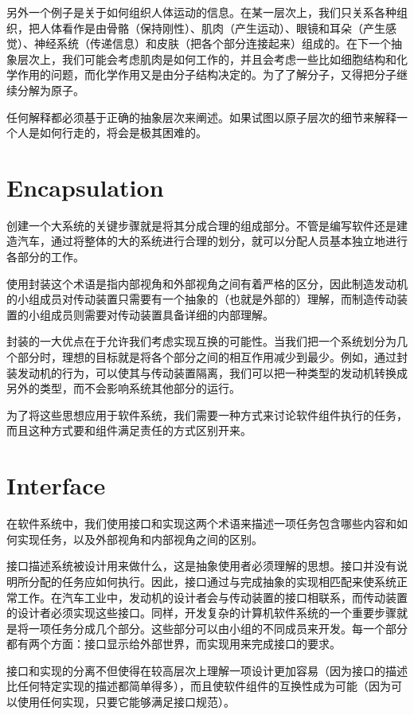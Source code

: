 另外一个例子是关于如何组织人体运动的信息。在某一层次上，我们只关系各种组织，把人体看作是由骨骼（保持刚性）、肌肉（产生运动）、眼镜和耳朵（产生感觉）、神经系统（传递信息）和皮肤（把各个部分连接起来）组成的。在下一个抽象层次上，我们可能会考虑肌肉是如何工作的，并且会考虑一些比如细胞结构和化学作用的问题，而化学作用又是由分子结构决定的。为了了解分子，又得把分子继续分解为原子。

任何解释都必须基于正确的抽象层次来阐述。如果试图以原子层次的细节来解释一个人是如何行走的，将会是极其困难的。


\section{Encapsulation}


创建一个大系统的关键步骤就是将其分成合理的组成部分。不管是编写软件还是建造汽车，通过将整体的大的系统进行合理的划分，就可以分配人员基本独立地进行各部分的工作。

使用封装这个术语是指内部视角和外部视角之间有着严格的区分，因此制造发动机的小组成员对传动装置只需要有一个抽象的（也就是外部的）理解，而制造传动装置的小组成员则需要对传动装置具备详细的内部理解。

封装的一大优点在于允许我们考虑实现互换的可能性。当我们把一个系统划分为几个部分时，理想的目标就是将各个部分之间的相互作用减少到最少。例如，通过封装发动机的行为，可以使其与传动装置隔离，我们可以把一种类型的发动机转换成另外的类型，而不会影响系统其他部分的运行。

为了将这些思想应用于软件系统，我们需要一种方式来讨论软件组件执行的任务，而且这种方式要和组件满足责任的方式区别开来。


\section{Interface}

在软件系统中，我们使用接口和实现这两个术语来描述一项任务包含哪些内容和如何实现任务，以及外部视角和内部视角之间的区别。

接口描述系统被设计用来做什么，这是抽象使用者必须理解的思想。接口并没有说明所分配的任务应如何执行。因此，接口通过与完成抽象的实现相匹配来使系统正常工作。在汽车工业中，发动机的设计者会与传动装置的接口相联系，而传动装置的设计者必须实现这些接口。同样，开发复杂的计算机软件系统的一个重要步骤就是将一项任务分成几个部分。这些部分可以由小组的不同成员来开发。每一个部分都有两个方面：接口显示给外部世界，而实现用来完成接口的要求。

接口和实现的分离不但使得在较高层次上理解一项设计更加容易（因为接口的描述比任何特定实现的描述都简单得多），而且使软件组件的互换性成为可能（因为可以使用任何实现，只要它能够满足接口规范）。

